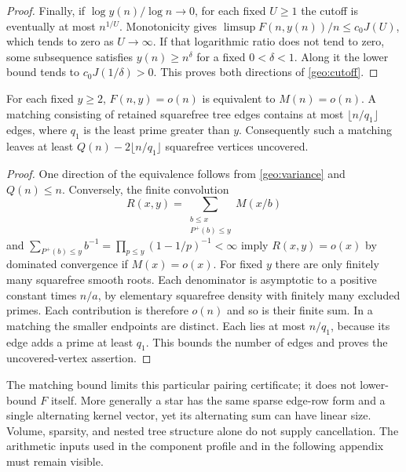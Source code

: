 \begin{proof}
Finally, if $\log y(n)/\log n\to0$, for each fixed $U\ge1$ the cutoff is eventually at most $n^{1/U}$. Monotonicity gives $\limsup F(n,y(n))/n\le c_0J(U)$, which tends to zero as $U\to\infty$. If that logarithmic ratio does not tend to zero, some subsequence satisfies $y(n)\ge n^\delta$ for a fixed $0<\delta<1$. Along it the lower bound tends to $c_0J(1/\delta)>0$. This proves both directions of \eqref{geo:cutoff}.
\end{proof}

\begin{proposition}\label{geo:limitations}
For each fixed $y\ge2$, $F(n,y)=o(n)$ is equivalent to $M(n)=o(n)$. A matching consisting of retained squarefree tree edges contains at most $\lfloor n/q_1\rfloor$ edges, where $q_1$ is the least prime greater than $y$. Consequently such a matching leaves at least $Q(n)-2\lfloor n/q_1\rfloor$ squarefree vertices uncovered.
\end{proposition}
\begin{proof}
One direction of the equivalence follows from \eqref{geo:variance} and $Q(n)\le n$. Conversely, the finite convolution
\[
 R(x,y)=\sum_{\substack{b\le x\\P^+(b)\le y}}M(x/b)
\]
and $\sum_{P^+(b)\le y}b^{-1}=\prod_{p\le y}(1-1/p)^{-1}<\infty$ imply $R(x,y)=o(x)$ by dominated convergence if $M(x)=o(x)$. For fixed $y$ there are only finitely many squarefree smooth roots. Each denominator is asymptotic to a positive constant times $n/a$, by elementary squarefree density with finitely many excluded primes. Each contribution is therefore $o(n)$ and so is their finite sum. In a matching the smaller endpoints are distinct. Each lies at most $n/q_1$, because its edge adds a prime at least $q_1$. This bounds the number of edges and proves the uncovered-vertex assertion.
\end{proof}

The matching bound limits this particular pairing certificate; it does not lower-bound $F$ itself. More generally a star has the same sparse edge-row form and a single alternating kernel vector, yet its alternating sum can have linear size. Volume, sparsity, and nested tree structure alone do not supply cancellation. The arithmetic inputs used in the component profile and in the following appendix must remain visible.
